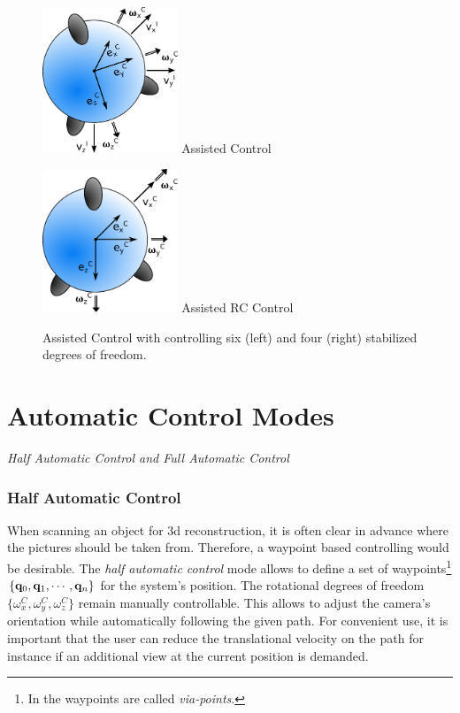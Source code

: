 \begin{figure}[H]		
	\small{
		\begin{center}
			\parbox{0.36\textwidth}{\centering \includegraphics[width=0.36\textwidth]{AC}
			 Assisted Control}
			\hspace{0.1\textwidth}			
			\parbox{0.36\textwidth}{\centering \includegraphics[width=0.36\textwidth]{RC}
			Assisted RC Control}
	\caption[Assisted Control]{Assisted Control with controlling six (left) and four (right) stabilized degrees of freedom.}
		\label{fig:assisted_control}
		\end{center}
	}			
	\vspace{4.5mm}
\end{figure}

\section{Automatic Control Modes}
\label{sec:automaticControlModes}
\textit{Half Automatic Control and Full Automatic Control}

\subsubsection{Half Automatic Control}
When scanning an object for 3d reconstruction, it is often clear in advance where the pictures should be taken from. Therefore, a waypoint based controlling would be desirable. The \textit{half automatic control} mode allows to define a set of waypoints\footnote{In \cite{biagiotti} the waypoints are called \textit{via-points}.} $\{{\bf q}_0, {\bf q}_1, \cdots, {\bf q}_n\}$ for the system's position. The rotational degrees of freedom $\{\omega_x^C, \omega_y^C, \omega_z^C\}$ remain manually controllable. This allows to adjust the camera's orientation while automatically following the given path. For convenient use, it is important that the user can reduce the translational velocity on the path for instance if an additional view at the current position is demanded.

